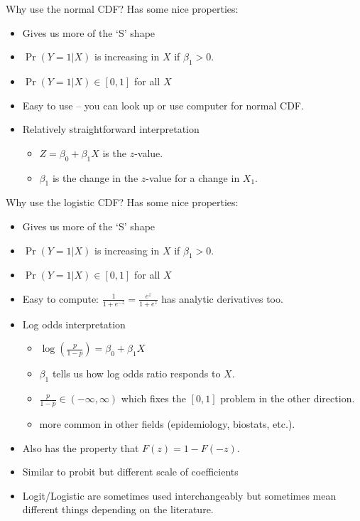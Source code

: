 \documentclass[aspectratio=169,11pt]{beamer}
\begin{document}
\begin{frame}{Why use the normal CDF?}
Has some nice properties:
\begin{itemize}
\item Gives us more of the `S' shape
\item $\Pr(Y=1|X)$ is increasing in $X$ if $\beta_1>0$.
\item $\Pr(Y=1|X) \in [0,1]$ for all $X$
\item Easy to use -- you can look up or use computer for normal CDF.
\item Relatively straightforward interpretation
\begin{itemize}
\item $Z=\beta_0 + \beta_1 X$ is the $z$-value.
\item $\beta_1$ is the change in the $z$-value for a change in $X_1$.
\end{itemize}
\end{itemize}
\end{frame}


\begin{frame}{Why use the logistic CDF?}
Has some nice properties:
\begin{itemize}
\item Gives us more of the `S' shape
\item $\Pr(Y=1|X)$ is increasing in $X$ if $\beta_1>0$.
\item $\Pr(Y=1|X) \in [0,1]$ for all $X$
\item Easy to compute: $\frac{1}{1+e^{-z}}=\frac{e^{z}}{1+e^{z}}$ has analytic derivatives too.
\item Log odds interpretation
\begin{itemize}
\item $\log(\frac{p}{1-p}) = \beta_0 + \beta_1 X$
\item $\beta_1$ tells us how \alert{log odds ratio} responds to $X$.
\item $\frac{p}{1-p} \in (-\infty,\infty)$ which fixes the $[0,1]$ problem in the other direction.
\item more common in other fields (epidemiology, biostats, etc.).
\end{itemize}
\item Also has the property that $F(z) = 1-F(-z)$.
\item Similar to probit but different scale of coefficients
\item Logit/Logistic are sometimes used interchangeably but sometimes mean different things depending on the literature.
\end{itemize}
\end{frame}
\end{document}
